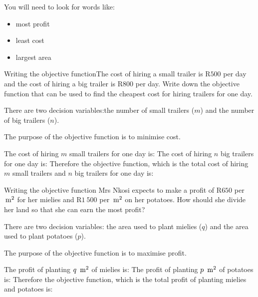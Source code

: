 You will need to look for words like:
\begin{itemize}
\item{most profit}
\item{least cost}
\item{largest area}
\end{itemize}

\begin{wex}
{Writing the objective function}{The cost of hiring a small trailer is R$500$ per day and the cost of hiring a big trailer is R$800$ per day. Write down the objective function that can be used to find the cheapest cost for hiring trailers for one day.}
{
There are two decision variables:the number of small trailers ($m$) and the number of big trailers ($n$).

The purpose of the objective function is to minimise cost.

The cost of hiring $m$ small trailers for one day is:
The cost of hiring $n$ big trailers for one day is:
Therefore the objective function, which is the total cost of hiring $m$ small trailers and $n$ big trailers for one day is:
}
\end{wex}

\begin{wex}
{Writing the objective function}{
Mrs Nkosi expects to make a profit of R$650$ per $\,\rm{m}^2$ for her mielies and R$1~500$ per $\,\rm{m}^2$ on her potatoes. How should she divide her land so that she can earn the most profit?}
{
There are two decision variables: the area used to plant mielies ($q$) and the area used to plant potatoes ($p$).

The purpose of the objective function is to maximise profit.

The profit of planting $q ~\,\rm{m}^2$ of mielies is:
The profit of planting $p~\,\rm{m}^2$ of potatoes is:
Therefore the objective function, which is the total profit of planting mielies and potatoes is:
}
\end{wex}


